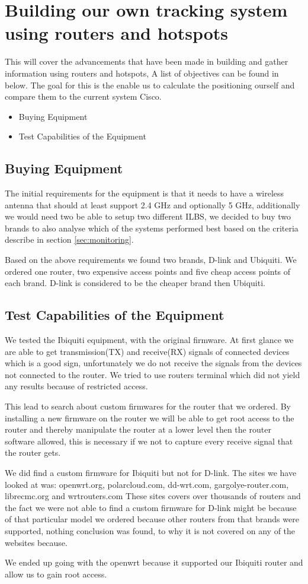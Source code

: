 \section{Building our own tracking system using routers and hotspots}
This will cover the advancements that have been made in building and gather information using routers and hotspots, A list of objectives can be found in below. The goal for this is the enable us to calculate the positioning ourself and compare them to the current system Cisco.

\begin{itemize}
	\item Buying Equipment
	\item Test Capabilities of the Equipment
\end{itemize}

\subsection*{Buying Equipment}
The initial requirements for the equipment is that it needs to have a wireless antenna that should at least support 2.4 GHz and optionally 5 GHz, additionally we would need two be able to setup two different ILBS, we decided to buy two brands to also analyse which of the systems performed best based on the criteria describe in section \ref{sec:monitoring}.

Based on the above requirements we found two brands, D-link and Ubiquiti. We ordered one router, two expensive access points and five cheap access points of each brand. D-link is considered to be the cheaper brand then Ubiquiti.

\subsection*{Test Capabilities of the Equipment}
We tested the Ibiquiti equipment, with the original firmware. At first glance we are able to get transmission(TX) and receive(RX) signals of connected devices which is a good sign, unfortunately we do not receive the signals from the devices not connected to the router. We tried to use routers terminal which did not yield any results because of restricted access.

This lead to search about custom firmwares for the router that we ordered. By installing a new firmware on the router we will be able to get root access to the router and thereby manipulate the router at a lower level then the router software allowed, this is necessary if we not to capture every receive signal that the router gets.

We did find a custom firmware for Ibiquiti but not for D-link. The sites we have looked at was: openwrt.org, polarcloud.com, dd-wrt.com, gargolye-router.com, librecmc.org and wrtrouters.com These sites covers over thousands of routers and the fact we were not able to find a custom firmware for D-link might be because of that particular model we ordered because other routers from that brands were supported, nothing conclusion was found, to why it is not covered on any of the websites because.

We ended up going with the openwrt because it supported our Ibiquiti router and allow us to gain root access.